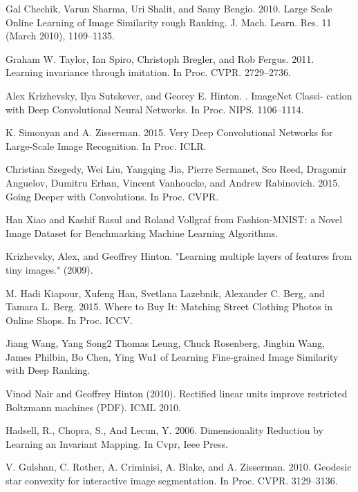 \documentclass[10pt,twocolumn,letterpaper]{article}
\begin{document}
{\begin{thebibliography}{10}
Gal Chechik, Varun Sharma, Uri Shalit, and Samy Bengio. 2010. 
\newblock Large Scale Online Learning of Image Similarity rough Ranking. J. Mach. Learn. Res. 11 (March 2010), 1109–1135.

Graham W. Taylor, Ian Spiro, Christoph Bregler, and Rob Fergus. 2011. 
\newblock Learning invariance through imitation.
\newblock In Proc. CVPR. 2729–2736.

Alex Krizhevsky, Ilya Sutskever, and Georey E. Hinton. 
. ImageNet Classi- cation with Deep Convolutional Neural Networks. 
\newblock In Proc. NIPS. 1106–1114.

K. Simonyan and A. Zisserman. 2015. 
\newblock Very Deep Convolutional Networks for Large-Scale Image Recognition.
\newblock In Proc. ICLR. 

Christian Szegedy, Wei Liu, Yangqing Jia, Pierre Sermanet, Sco Reed, Dragomir Anguelov, Dumitru Erhan, Vincent Vanhoucke, and Andrew Rabinovich. 2015.
\newblock Going Deeper with Convolutions. 
\newblock In Proc. CVPR.

Han Xiao and Kashif Rasul and Roland Vollgraf from Fashion-MNIST: a Novel Image Dataset for Benchmarking Machine Learning Algorithms.

Krizhevsky, Alex, and Geoffrey Hinton. 
\newblock "Learning multiple layers of features from tiny images." (2009).

M. Hadi Kiapour, Xufeng Han, Svetlana Lazebnik, Alexander C. Berg, and Tamara L. Berg. 2015. 
\newblock Where to Buy It: Matching Street Clothing Photos in Online Shops.
\newblock In Proc. ICCV.

Jiang Wang, Yang Song2 Thomas Leung, Chuck Rosenberg, Jingbin Wang, James Philbin, Bo Chen, Ying Wu1 
\newblock of Learning Fine-grained Image Similarity with Deep Ranking.

Vinod Nair and Geoffrey Hinton (2010).
\newblock Rectified linear units improve restricted Boltzmann machines (PDF). 
\newblock ICML 2010.

Hadsell, R., Chopra, S., And Lecun, Y. 2006.
\newblock Dimensionality Reduction by Learning an Invariant Mapping.
\newblock In Cvpr, Ieee Press.

V. Gulshan, C. Rother, A. Criminisi, A. Blake, and A. Zisserman. 2010. 
\newblock Geodesic star convexity for interactive image segmentation.
\newblock In Proc. CVPR. 3129–3136.


\end{thebibliography}}
\end{document}
